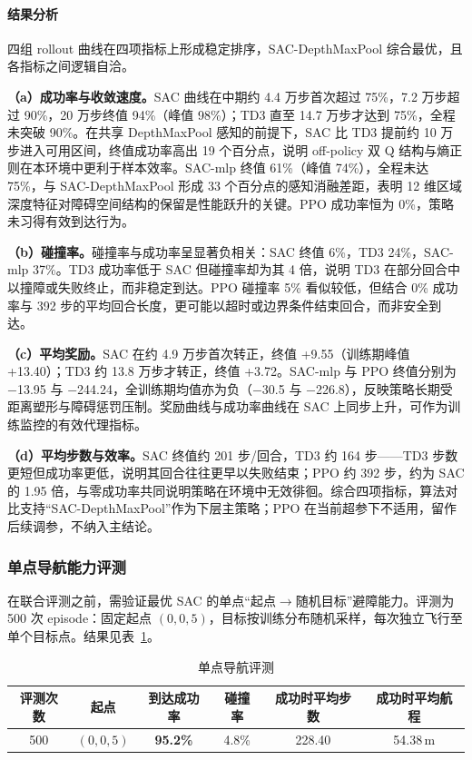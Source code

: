 \paragraph{结果分析}
四组 rollout 曲线在四项指标上形成稳定排序，SAC-DepthMaxPool 综合最优，且各指标之间逻辑自洽。

\textbf{（a）成功率与收敛速度。}SAC 曲线在中期约 4.4 万步首次超过 75\%，7.2 万步超过 90\%，20 万步终值 94\%（峰值 98\%）；TD3 直至 14.7 万步才达到 75\%，全程未突破 90\%。在共享 DepthMaxPool 感知的前提下，SAC 比 TD3 提前约 10 万步进入可用区间，终值成功率高出 19 个百分点，说明 off-policy 双 Q 结构与熵正则在本环境中更利于样本效率。SAC-mlp 终值 61\%（峰值 74\%），全程未达 75\%，与 SAC-DepthMaxPool 形成 33 个百分点的感知消融差距，表明 12 维区域深度特征对障碍空间结构的保留是性能跃升的关键。PPO 成功率恒为 0\%，策略未习得有效到达行为。

\textbf{（b）碰撞率。}碰撞率与成功率呈显著负相关：SAC 终值 6\%，TD3 24\%，SAC-mlp 37\%。TD3 成功率低于 SAC 但碰撞率却为其 4 倍，说明 TD3 在部分回合中以撞障或失败终止，而非稳定到达。PPO 碰撞率 5\% 看似较低，但结合 0\% 成功率与 392 步的平均回合长度，更可能以超时或边界条件结束回合，而非安全到达。

\textbf{（c）平均奖励。}SAC 在约 4.9 万步首次转正，终值 +9.55（训练期峰值 +13.40）；TD3 约 13.8 万步才转正，终值 +3.72。SAC-mlp 与 PPO 终值分别为 $-$13.95 与 $-$244.24，全训练期均值亦为负（$-$30.5 与 $-$226.8），反映策略长期受距离塑形与障碍惩罚压制。奖励曲线与成功率曲线在 SAC 上同步上升，可作为训练监控的有效代理指标。

\textbf{（d）平均步数与效率。}SAC 终值约 201 步/回合，TD3 约 164 步——TD3 步数更短但成功率更低，说明其回合往往更早以失败结束；PPO 约 392 步，约为 SAC 的 1.95 倍，与零成功率共同说明策略在环境中无效徘徊。综合四项指标，算法对比支持``SAC-DepthMaxPool''作为下层主策略；PPO 在当前超参下不适用，留作后续调参，不纳入主结论。

\subsubsection{单点导航能力评测}

在联合评测之前，需验证最优 SAC 的单点``起点$\to$随机目标''避障能力。评测为 500 次 episode：固定起点 $(0,0,5)$，目标按训练分布随机采样，每次独立飞行至单个目标点。结果见表~\ref{tab:nav-single}。

\begin{table}[htbp]
  \centering
  \caption{单点导航评测}
  \label{tab:nav-single}
  \begin{tabular}{cccccc}
    \toprule
    评测次数 & 起点 & 到达成功率 & 碰撞率 & 成功时平均步数 & 成功时平均航程 \\
    \midrule
    500 & $(0,0,5)$ & \textbf{95.2\%} & 4.8\% & 228.40 & 54.38\,m \\
    \bottomrule
  \end{tabular}

\end{table}

